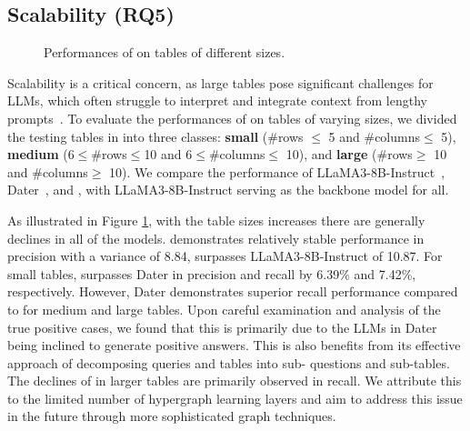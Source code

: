 {\subsection{Scalability (RQ5)}
\begin{figure}[t!]
    \centering
  \begin{minipage}[t]{0.49\linewidth} %
  \end{minipage}
  \begin{minipage}[t]{0.49\linewidth} %
  \end{minipage}
\vspace{-0.1in}
\caption{Performances of \name on tables of different sizes.}
\vspace{-0.2in}
\label{fig:scalability}
\end{figure}
Scalability is a critical concern, as large tables pose significant challenges for LLMs, which often struggle to interpret and integrate context from lengthy prompts~\cite{liu-etal-2024-lost,10.1145/3539618.3591708}. To evaluate the performances of \name on tables of varying sizes, we divided the testing tables in \cite{2019TabFactA} into three classes: \textbf{small} (\#rows $\leq$ 5 and \#columns$\leq$ 5), \textbf{medium} (6$\leq$\#rows$\leq$10 and 6$\leq$\#columns$\leq$ 10), and \textbf{large} (\#rows$\geq$ 10 and \#columns$\geq$ 10). We compare the performance of LLaMA3-8B-Instruct~\cite{touvron2024llama3}, Dater~\cite{dater}, and \name, with LLaMA3-8B-Instruct serving as the backbone model for all.

As illustrated in Figure \ref{fig:scalability}, with the table sizes increases there are generally declines in all of the models. \name demonstrates relatively stable performance in precision with a variance of 8.84, surpasses LLaMA3-8B-Instruct of 10.87. For small tables, \name surpasses Dater in precision and recall by 6.39\% and 7.42\%, respectively. However, Dater demonstrates superior recall performance compared to \name for medium and large tables. Upon careful examination and analysis of the true positive cases, we found that this is primarily due to the LLMs in Dater being inclined to generate positive answers. This is also benefits from its effective approach of decomposing queries and tables into sub- questions and sub-tables. The declines of \name in larger tables are primarily observed in recall. We attribute this to the limited number of hypergraph learning layers and aim to address this issue in the future through more sophisticated graph techniques.

}
